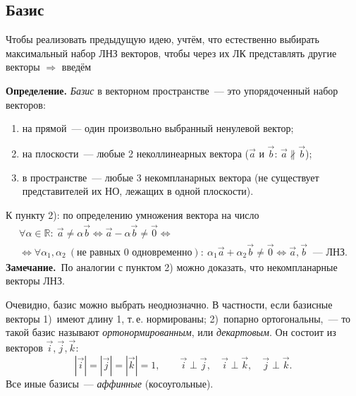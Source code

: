 \documentclass[a4paper,11pt]{article}
\newcommand{\zam}{\textbf{Замечание.}\ }
\begin{document}
\subsection{Базис}
Чтобы реализовать предыдущую идею, учтём, что естественно выбирать максимальный набор ЛНЗ векторов,
чтобы через их ЛК представлять другие векторы $\Rightarrow$ введём
\begin{opr}
\textbf{Определение.} \emph{Базис} в векторном пространстве~--- это упорядоченный набор векторов:
\begin{enumerate}[label=\arabic*)]
\item на прямой~--- один произвольно выбранный ненулевой вектор;
\item на плоскости~--- любые 2 неколлинеарных вектора ($\vec a$ и $\vec b$: $\vec a\nparallel\vec b$);
\item в пространстве~--- любые 3 некомпланарных вектора (не существует представителей их НО,
лежащих в одной плоскости).
\end{enumerate}
\end{opr}
К пункту 2): по определению умножения вектора на число
\begin{multline*}
\forall\alpha\in\mathbb R:\ \vec a\ne\alpha\vec b\iff\vec a-\alpha\vec b\ne\vec0\iff{}\\
\iff\forall\alpha_1,\alpha_2\ (\text{не равных 0 одновременно}):\ \alpha_1\vec a+\alpha_2\vec b\ne\vec0
\iff\vec a,\vec b\ \text{~--- ЛНЗ}.
\end{multline*}
\zam По аналогии с пунктом 2) можно доказать, что некомпланарные векторы ЛНЗ.

Очевидно, базис можно выбрать неоднозначно. В частности, если базисные векторы 1)~имеют длину 1,
т.\,е. нормированы; 2)~попарно ортогональны,~--- то такой базис называют \emph{ортонормированным},
или \emph{декартовым}. Он состоит из векторов $\vec i,\vec j,\vec k$:
\[
|\vec i|=|\vec j|=|\vec k|=1,\qquad \vec i\perp\vec j,\quad \vec i\perp\vec k,\quad \vec j\perp\vec k.
\]
Все иные базисы~--- \emph{аффинные} (косоугольные).
\end{document}
